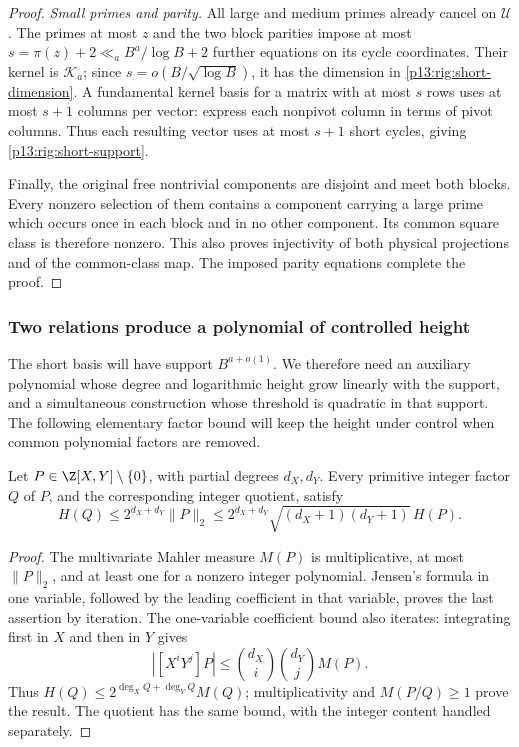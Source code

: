\begin{proof}
\emph{Small primes and parity.}
All large and medium primes already cancel on $\mathcal U$.
The primes at most $z$ and the two block parities impose at
most $s=\pi(z)+2\ll_a B^a/\log B+2$ further equations on its
cycle coordinates.  Their kernel is $\mathcal K_a$; since
$s=o(B/\sqrt{\log B})$, it has the dimension in
\eqref{p13:rig:short-dimension}.  A fundamental kernel basis
for a matrix with at most $s$ rows uses at most $s+1$ columns
per vector: express each nonpivot column in terms of pivot
columns.  Thus each resulting vector uses at most $s+1$
short cycles, giving \eqref{p13:rig:short-support}.

Finally, the original free nontrivial components are disjoint
and meet both blocks.  Every nonzero selection of them contains
a component carrying a large prime which occurs once in each
block and in no other component.  Its common square class is
therefore nonzero.  This also proves injectivity of both physical
projections and of the common-class map.  The imposed parity
equations complete the proof.
\end{proof}

\subsubsection{Two relations produce a polynomial of controlled height}

The short basis will have support $B^{a+o(1)}$.  We therefore
need an auxiliary polynomial whose degree and logarithmic
height grow linearly with the support, and a simultaneous
construction whose threshold is quadratic in that support.
The following elementary factor bound will keep the height
under control when common polynomial factors are removed.

\begin{lemma}
\label{p13:rig:factor-height}
Let $P\in\Z[X,Y]\setminus\{0\}$, with partial degrees
$d_X,d_Y$.  Every primitive integer factor $Q$ of $P$, and
the corresponding integer quotient, satisfy
\[
 H(Q)\le2^{d_X+d_Y}\|P\|_2
       \le2^{d_X+d_Y}\sqrt{(d_X+1)(d_Y+1)}\,H(P).
\]
\end{lemma}

\begin{proof}
The multivariate Mahler measure $M(P)$ is multiplicative,
at most $\|P\|_2$, and at least one for a nonzero integer
polynomial.  Jensen's formula in one variable, followed by
the leading coefficient in that variable, proves the last
assertion by iteration.  The one-variable coefficient bound
also iterates: integrating first in $X$ and then in $Y$ gives
\[
 |[X^iY^j]P|\le\binom{d_X}{i}\binom{d_Y}{j}M(P).
\]
Thus $H(Q)\le2^{\deg_XQ+\deg_YQ}M(Q)$; multiplicativity
and $M(P/Q)\ge1$ prove the result.  The quotient has the same
bound, with the integer content handled separately.
\end{proof}

